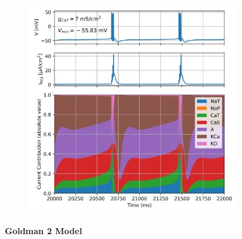\documentclass[../main.tex]{subfiles}
\begin{document}
{\begin{figure}[!t]
\begin{subfigure}[t]{0.48\textwidth}
        \includegraphics[width=\linewidth]{../img/rmp/goldman_1_g_7.png}
        \label{fig:rmp_models_contrib_5_goldman_1}
    \end{subfigure}

    \textbf{Goldman 2 Model} \\[1ex]  %


\end{figure}}
\end{document}
